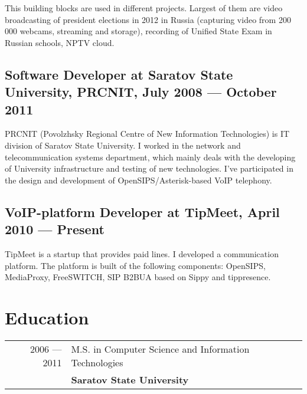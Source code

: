 \documentclass[a4paper,10pt]{article}
\begin{document}
This building blocks are used in different projects. Largest of them are video broadcasting of president elections in 2012 in Russia (capturing video from 200 000 webcams, streaming and storage), recording of Unified State Exam in Russian schools, NPTV cloud.

\subsection{Software Developer at Saratov State University, PRCNIT, July 2008 ---
October 2011}
PRCNIT (Povolzhsky Regional Centre of New Information Technologies) is IT division of Saratov State University. I worked in the network and telecommunication systems department, which mainly deals with the developing of University infrastructure and testing of new technologies. I've participated in the design and development of OpenSIPS/Asterisk-based VoIP telephony.

\subsection{VoIP-platform Developer at TipMeet, April 2010 --- Present}
TipMeet is a startup that provides paid lines. I developed a communication platform. The platform is built of the following components: OpenSIPS, MediaProxy, FreeSWITCH, SIP B2BUA based on Sippy and tippresence.

\section{Education}
\begin{tabular}{rl}
2006 --- 2011& M.S. in Computer Science and Information
Technologies \\& \textbf{Saratov State University}
\end{tabular}
\end{document}
